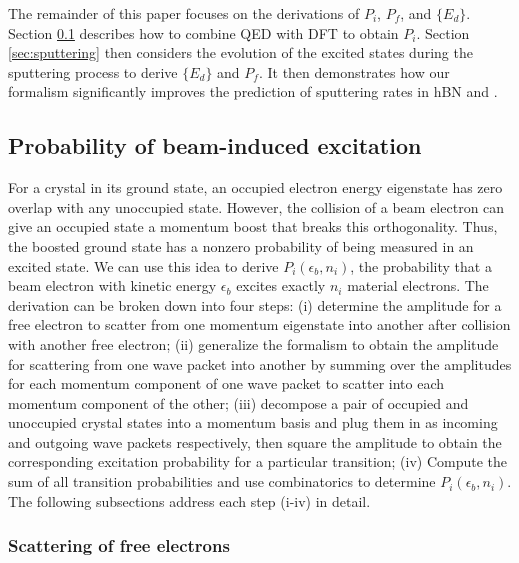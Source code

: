 \documentclass[twoside,twocolumn,9pt]{article}
\begin{document}
The remainder of this paper focuses on the derivations of $P_i$, $P_f$, and
$\{E_d\}$.
Section \ref{sec:probability} describes how to combine QED with DFT to obtain
$P_i$.
Section \ref{sec:sputtering} then considers the evolution of the excited states
during the sputtering process to derive $\{E_d\}$ and $P_f$. It then demonstrates
how our formalism significantly improves the prediction of sputtering rates in
hBN and .

\subsection{Probability of beam-induced excitation} 
\label{sec:probability}

For a crystal in its ground state, an occupied electron
energy eigenstate has zero overlap with any unoccupied state.
However, the collision of a beam electron can give an occupied state a
momentum boost that breaks this orthogonality.
Thus, the boosted ground state has a nonzero probability of being measured in
an excited state.
We can use this idea to derive $P_i(\epsilon_b, n_i)$, the probability that a
beam electron with kinetic energy $\epsilon_b$ excites exactly $n_i$ material
electrons.
The derivation can be broken down into four steps:
(i)
determine the amplitude for a free electron to scatter from one momentum
eigenstate into another after collision with another free electron;
(ii)
generalize the formalism to obtain the amplitude for scattering from one wave
packet into another by summing over the amplitudes for each momentum component
of one wave packet to scatter into each momentum component of the other;
(iii)
decompose a pair of occupied and unoccupied crystal states into a momentum
basis and plug them in as incoming and outgoing wave packets respectively, then
square the amplitude to obtain the corresponding excitation probability for a
particular transition;
(iv)
Compute the sum of all transition probabilities and use combinatorics to
determine $P_i(\epsilon_b, n_i)$.
The following subsections address each step (i-iv) in detail.

\subsubsection{Scattering of free electrons} 
\label{sec:ee}
\end{document}
